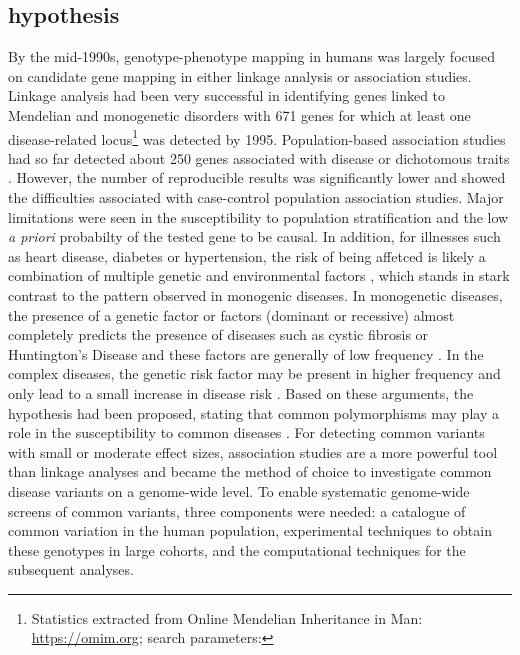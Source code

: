 \subsection{ hypothesis}
By the mid-1990s, genotype-phenotype mapping in humans was largely focused on candidate gene mapping in either linkage analysis or association studies. Linkage analysis had been very successful in identifying genes linked to Mendelian and monogenetic disorders with \num{671} genes for which at least one disease-related locus\footnote{Statistics extracted from Online Mendelian Inheritance in Man: \url{https://omim.org}; search parameters: } was detected by 1995. Population-based association studies had so far detected about 250 genes associated with disease or dichotomous traits \citep{Hirschhorn2002}. However, the number of reproducible results was significantly lower and showed the difficulties associated with case-control population association studies. Major limitations were seen in the susceptibility to population stratification \citep{Lohmueller2003} and the low \textit{a priori} probabilty of the tested gene to be causal. In addition, for illnesses such as heart disease, diabetes or hypertension, the risk of being affetced is likely a combination of multiple genetic and environmental factors \citep{Hunter2005}, which stands in stark contrast to the pattern observed in monogenic diseases. In monogenetic diseases, the presence of a genetic factor or factors (dominant or recessive) almost completely predicts the presence of diseases such as cystic fibrosis or Huntington's Disease and these factors are generally of low frequency \citep{Sankaranarayanan1998}.  In the complex diseases, the genetic risk factor may be present in higher frequency and only lead to a small increase in disease risk \citep{Reich2001}. Based on these arguments, the  hypothesis had been proposed, stating that common polymorphisms may play a role in the susceptibility to common diseases \citep{Risch1996,Lander1996,Chakravarti1999,Reich2001}. For detecting common variants with small or moderate effect sizes, association studies are a more powerful tool than linkage analyses \citep{Ott2015} and became the method of choice to investigate common disease variants on a genome-wide level. To enable systematic genome-wide screens of common variants, three components were needed: a catalogue of common variation in the human population, experimental techniques to obtain these genotypes in large cohorts, and the computational techniques for the subsequent analyses. 

